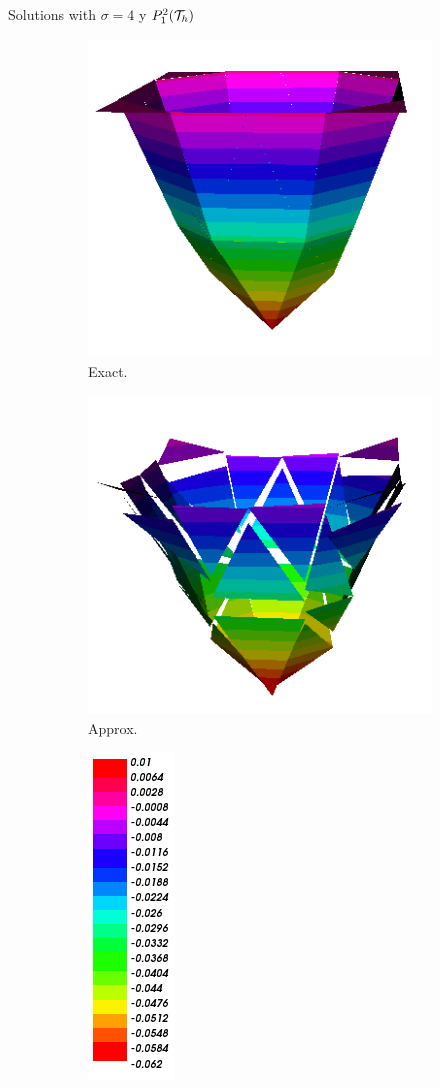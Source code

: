 	\begin{frame}{Solutions with $\sigma=4$ y $\relax{P}^2_1(\mathcal{T}_h)$}
		\begin{figure}[h!]
			\begin{subfigure}[b]{0.2\textwidth}
				\centering
				\includegraphics[scale=0.16]{img/Difusion/Recortes/steady_diffusion_exact_n_4.png}
				\caption{\scriptsize Exact.}
			\end{subfigure}
			\begin{subfigure}[b]{0.2\textwidth}
				\centering
				\includegraphics[scale=0.16]{img/Difusion/Recortes/steady_diffusion_approx_n_4.png}
				\caption{\scriptsize Approx.}
			\end{subfigure}
			\begin{subfigure}[b]{0.1\textwidth}
				\centering
				\includegraphics[scale=0.23]{img/Difusion/Recortes/steady_diffusion_values.png}

\end{subfigure}
\end{figure}
\end{frame}
